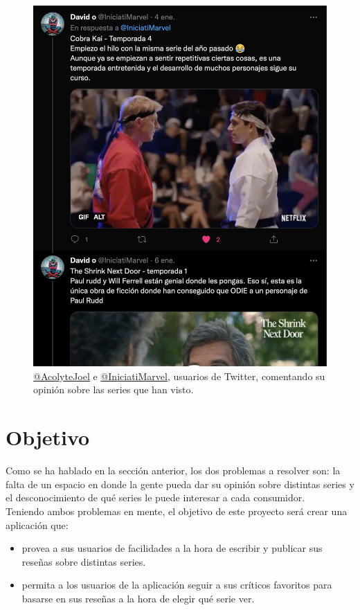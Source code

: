 \begin{figure}[H]
    \includegraphics[scale=0.253]{img/twitter-thread-2.png}
	\caption{ \href{https://twitter.com/AcolyteJoel}{@AcolyteJoel} e \href{https://twitter.com/IniciatiMarvel}{@IniciatiMarvel}, usuarios de Twitter, comentando su opinión sobre las series que han visto. }
    \label{fig:twitter_threads}
\end{figure}

\section{Objetivo}
Como se ha hablado en la sección anterior, los dos problemas a resolver son: la falta de un espacio en donde la gente pueda dar su opinión sobre distintas series y el desconocimiento de qué series le puede interesar a cada consumidor.\\

Teniendo ambos problemas en mente, el objetivo de este proyecto será crear una aplicación que:
\begin{itemize}
    \item provea a sus usuarios de facilidades a la hora de escribir y publicar sus reseñas sobre distintas series.
    \item permita a los usuarios de la aplicación seguir a sus críticos favoritos para basarse en sus reseñas a la hora de elegir qué serie ver.
\end{itemize}
